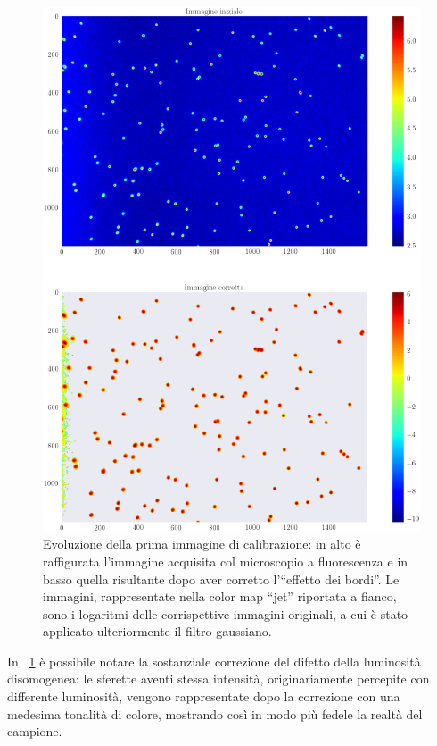 \begin{figure}
 \centering
 \includegraphics[scale=.40]{img/CAP4lg1.png}
 \caption{\small{Evoluzione della prima immagine di calibrazione: in alto è raffigurata l'immagine acquisita col microscopio a fluorescenza e in basso quella risultante dopo aver corretto l'``effetto dei bordi''. Le immagini, rappresentate nella color map ``jet'' riportata a fianco, sono i logaritmi delle corrispettive immagini originali, a cui è stato applicato ulteriormente il filtro gaussiano.}}
 \label{fig:lg1}
\end{figure}

In \figurename~\ref{fig:lg1} è possibile notare la sostanziale correzione del difetto della luminosità disomogenea: le sferette aventi stessa intensità, originariamente percepite con differente luminosità, vengono rappresentate dopo la correzione con una medesima tonalità di colore, mostrando così in modo più fedele la realtà del campione.

